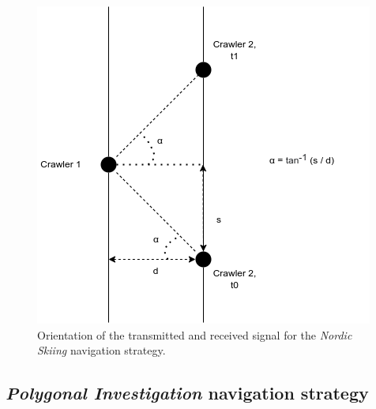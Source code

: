 \begin{figure}[h!]
	\centering
	\includegraphics[scale=0.5]{graphics/angle_ski_nordique.png}
	\caption{Orientation of the transmitted and received signal for the \textit{Nordic Skiing} navigation strategy.}
	\label{fig:angle_ski_nordique}
\end{figure}

\subsection*{\textit{Polygonal Investigation} navigation strategy}

